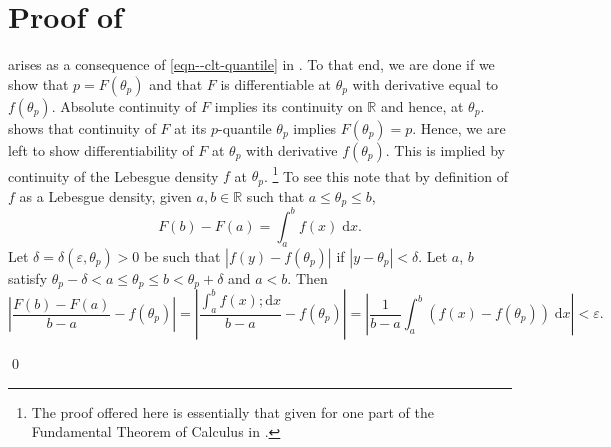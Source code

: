
\section{Proof of \texorpdfstring{}{Corollary
\ref{cor--clt-quantile}}}
\label{sec--prf--cor--clt-quantile}

 arises as a consequence of
\eqref{eqn--clt-quantile} in .
To that end, we are done if we show that \(p = F \left( \theta_{p} \right)\)
and that \(F\) is differentiable at \(\theta_{p}\) with derivative equal to \(f
\left( \theta_{p} \right)\).
Absolute continuity of \(F\) implies its continuity on \(\mathbb{R}\) and hence,
at \(\theta_{p}\).
 shows that continuity of \(F\) at its
\(p\)-quantile \(\theta_{p}\) implies \(F \left( \theta_{p} \right) = p\).
Hence, we are left to show differentiability of \(F\) at \(\theta_{p}\) with
derivative \(f \left( \theta_{p} \right)\).
This is implied by continuity of the Lebesgue density \(f\) at \(\theta_{p}\).%
\footnote{The proof offered here is essentially that given for one part of the
Fundamental Theorem of Calculus in \citet[Theorem 6.20,
pp. 133-134]{1976rudinPrinciplesMathematicalAnalysis}.}
To see this note that by definition of \(f\) as a Lebesgue density,
given \(a, b \in \mathbb{R}\) such that \(a \leq \theta_{p} \leq b\),
\begin{equation*}
  F (b) - F (a) = \int_{a}^{b} f (x) \; \mathrm{d} x.
\end{equation*}
Let \(\delta = \delta \left( \varepsilon, \theta_{p} \right) > 0\) be such that
\(\left| f (y) - f \left( \theta_{p} \right) \right|\) if
\(\left| y - \theta_{p} \right| < \delta\).
Let \(a\), \(b\) satisfy \(\theta_{p} - \delta < a \leq \theta_{p} \leq b <
\theta_{p} + \delta\) and \(a < b\).
Then
\begin{equation*}
  \left| \frac{F (b) - F (a)}{b - a} - f \left( \theta_{p} \right) \right| =
  \left| \frac{\int_{a}^{b} f (x) ; \mathrm{d} x}{b - a} - f \left( \theta_{p}
  \right) \right| = \left| \frac{1}{b - a} \int_{a}^{b} \left( f (x) - f \left(
  \theta_{p} \right) \right) \; \mathrm{d} x \right| < \varepsilon.
\end{equation*}

\qed


